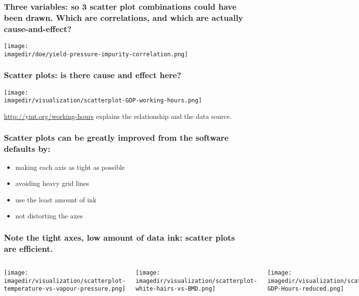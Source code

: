 \begin{frame}\frametitle{Three variables: so 3 scatter plot combinations could have been drawn. Which are correlations, and which are actually cause-and-effect?}
	\begin{center}
		\texttt{[image: \\imagedir/doe/yield-pressure-impurity-correlation.png]}
	\end{center}
	
	\vspace{-6pt}
	\color{blue}{We will answer the question in the Experiments section.}
\end{frame}


\begin{frame}\frametitle{Scatter plots: is there cause and effect here?}
	\begin{center}
		\texttt{[image: \\imagedir/visualization/scatterplot-GDP-working-hours.png]}
	\end{center}
	\href{http://www.economist.com/blogs/freeexchange/2013/09/working-hours}{http://yint.org/working-hours} explains the relationship and the data source.
\end{frame}


\begin{frame}\frametitle{Scatter plots can be greatly improved from the software defaults by:}
	\begin{itemize}
		\item	making each axis as tight as possible 
		\item	avoiding heavy grid lines 
		\item	use the least amount of ink 
		\item	not distorting the axes 
	\end{itemize}
\end{frame}

\begin{frame}\frametitle{Note the tight axes, low amount of data ink: scatter plots are efficient.}
	\begin{columns}[T]
			\centerline{\texttt{[image: \\imagedir/visualization/scatterplot-temperature-vs-vapour-pressure.png]}}
			
			\centerline{\texttt{[image: \\imagedir/visualization/scatterplot-white-hairs-vs-BMD.png]}}
			
			\centerline{\texttt{[image: \\imagedir/visualization/scatterplot-GDP-Hours-reduced.png]}}
	\end{columns}
	
\end{frame}


